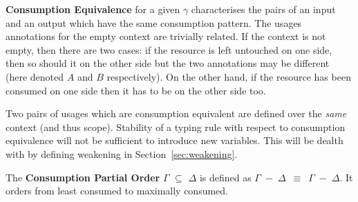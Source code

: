 \begin{definition}
\label{definition:differences}
\textbf{Consumption Equivalence} for a given \Context{} \ensuremath{\gamma} characterises
the pairs of an input and an output \Usages{\ensuremath{\gamma}} which have the same consumption
pattern. The usages annotations for the empty context are trivially related.
If the context is not empty, then there are two cases: if the
resource is left untouched on one side, then so should it on the other
side but the two annotations may be different (here denoted $A$ and $B$
respectively). On the other hand, if the resource has been consumed
on one side then it has to be on the other side too.
\end{definition}

\begin{remark}Two pairs of usages which are consumption equivalent are defined
over the \emph{same} context (and thus scope). Stability of a typing rule with
respect to consumption equivalence will not be sufficient to introduce new
variables. This will be dealth with by defining weakening in Section~\ref{sec:weakening}.
\end{remark}

\begin{definition}The \textbf{Consumption Partial Order} \ensuremath{\Gamma} \ensuremath{\subseteq} \ensuremath{\Delta} is defined as
\mbox{\ensuremath{\Gamma} \ensuremath{-} \ensuremath{\Delta} \ensuremath{\equiv} \ensuremath{\Gamma} \ensuremath{-} \ensuremath{\Delta}}. It orders \Usages{} from least consumed to maximally consumed.
\end{definition}

